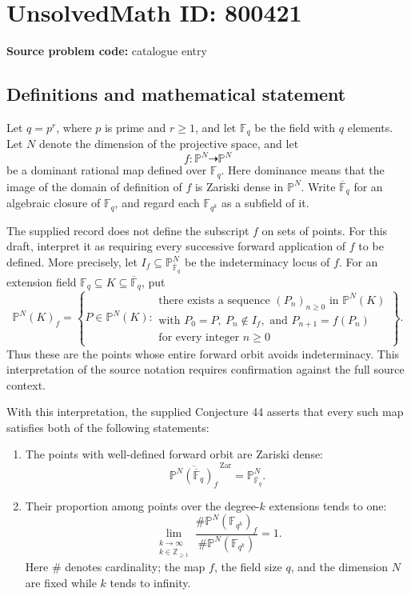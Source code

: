 \documentclass[11pt]{article}
\newcommand{\Z}{\mathbb{Z}}
\newcommand{\F}{\mathbb{F}}
\newcommand{\PP}{\mathbb{P}}
\begin{document}
\section*{UnsolvedMath ID: 800421}
\textbf{Source problem code:} catalogue entry
\subsection{Definitions and mathematical statement}
Let \(q=p^r\), where \(p\) is prime and \(r\geq 1\), and let \(\F_q\) be the field with \(q\) elements. Let \(N\) denote the dimension of the projective space, and let
\[
f:\PP^N\dashrightarrow\PP^N
\]
be a dominant rational map defined over \(\F_q\). Here dominance means that the image of the domain of definition of \(f\) is Zariski dense in \(\PP^N\). Write \(\overline{\F}_q\) for an algebraic closure of \(\F_q\), and regard each \(\F_{q^k}\) as a subfield of it.

The supplied record does not define the subscript \(f\) on sets of points. For this draft, interpret it as requiring every successive forward application of \(f\) to be defined. More precisely, let \(I_f\subseteq\PP^N_{\overline{\F}_q}\) be the indeterminacy locus of \(f\). For an extension field \(\F_q\subseteq K\subseteq\overline{\F}_q\), put
\[
\PP^N(K)_f=
\left\{P\in\PP^N(K):
\begin{array}{l}
\text{there exists a sequence }(P_n)_{n\geq0}\text{ in }\PP^N(K)\\
\text{with }P_0=P,\ P_n\notin I_f,\text{ and }P_{n+1}=f(P_n)\\
\text{for every integer }n\geq0
\end{array}
\right\}.
\]
Thus these are the points whose entire forward orbit avoids indeterminacy. This interpretation of the source notation requires confirmation against the full source context.

With this interpretation, the supplied Conjecture 44 asserts that every such map satisfies both of the following statements:
\begin{enumerate}
\item[(a)] The points with well-defined forward orbit are Zariski dense:
\[
\overline{\PP^N(\overline{\F}_q)_f}^{\,\mathrm{Zar}}
=\PP^N_{\overline{\F}_q}.
\]
\item[(b)] Their proportion among points over the degree-\(k\) extensions tends to one:
\[
\lim_{\substack{k\to\infty\\k\in\Z_{\geq1}}}
\frac{\#\PP^N(\F_{q^k})_f}
{\#\PP^N(\F_{q^k})}=1.
\]
Here \(\#\) denotes cardinality; the map \(f\), the field size \(q\), and the dimension \(N\) are fixed while \(k\) tends to infinity.
\end{enumerate}
\end{document}
